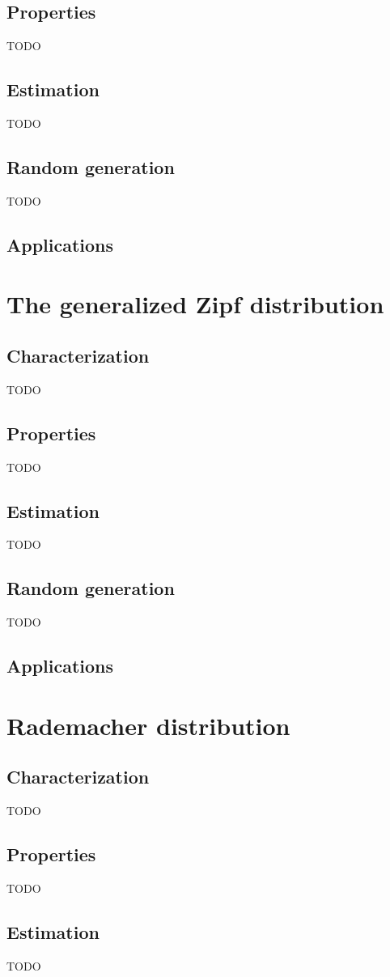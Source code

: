\subsection{Properties}
TODO
\subsection{Estimation}
TODO
\subsection{Random generation}
TODO
\subsection{Applications}

\section{The generalized Zipf distribution}
\subsection{Characterization}
TODO
\subsection{Properties}
TODO
\subsection{Estimation}
TODO
\subsection{Random generation}
TODO
\subsection{Applications}

\section{Rademacher distribution}
\subsection{Characterization}
TODO
\subsection{Properties}
TODO
\subsection{Estimation}
TODO
